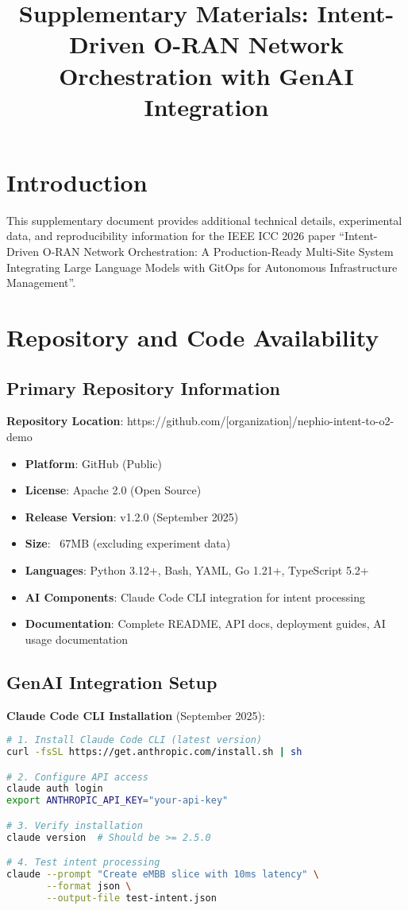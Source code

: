 \documentclass[conference]{IEEEtran}
\title{Supplementary Materials: Intent-Driven O-RAN Network Orchestration with GenAI Integration}
\author{
\IEEEauthorblockN{Authors}
\IEEEauthorblockA{Affiliation\\
Email: anonymous@review.org}
}
\begin{document}
\maketitle

\section{Introduction}

This supplementary document provides additional technical details, experimental data, and reproducibility information for the IEEE ICC 2026 paper ``Intent-Driven O-RAN Network Orchestration: A Production-Ready Multi-Site System Integrating Large Language Models with GitOps for Autonomous Infrastructure Management''.

\section{Repository and Code Availability}

\subsection{Primary Repository Information}

\textbf{Repository Location}: https://github.com/[organization]/nephio-intent-to-o2-demo
\begin{itemize}
\item \textbf{Platform}: GitHub (Public)
\item \textbf{License}: Apache 2.0 (Open Source)
\item \textbf{Release Version}: v1.2.0 (September 2025)
\item \textbf{Size}: ~67MB (excluding experiment data)
\item \textbf{Languages}: Python 3.12+, Bash, YAML, Go 1.21+, TypeScript 5.2+
\item \textbf{AI Components}: Claude Code CLI integration for intent processing
\item \textbf{Documentation}: Complete README, API docs, deployment guides, AI usage documentation
\end{itemize}

\subsection{GenAI Integration Setup}

\textbf{Claude Code CLI Installation} (September 2025):
\begin{lstlisting}[language=Bash]
# 1. Install Claude Code CLI (latest version)
curl -fsSL https://get.anthropic.com/install.sh | sh

# 2. Configure API access
claude auth login
export ANTHROPIC_API_KEY="your-api-key"

# 3. Verify installation
claude version  # Should be >= 2.5.0

# 4. Test intent processing
claude --prompt "Create eMBB slice with 10ms latency" \
       --format json \
       --output-file test-intent.json
\end{lstlisting}
\end{document}

